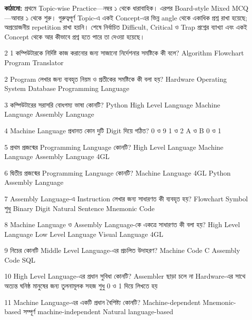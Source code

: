 \begin{infobox}
\textbf{কাঠামো:} প্রথমে Topic-wise Practice—নম্বর ১ থেকে ধারাবাহিক। এরপর Board-style Mixed MCQ—আবার ১ থেকে শুরু। গুরুত্বপূর্ণ Topic-এ একই Concept-এর ভিন্ন angle থেকে একাধিক প্রশ্ন রাখা হয়েছে; অপ্রয়োজনীয় repetition রাখা হয়নি। শেষে নির্বাচিত Difficult, Critical ও Trap প্রশ্নের ব্যাখ্যা এবং একই Concept থেকে আর কীভাবে প্রশ্ন হতে পারে তা দেওয়া হয়েছে।
\end{infobox}

\begin{multicols}{2}
\setlength{\columnsep}{4mm}
\raggedcolumns
{}
\mcq
{1}
{কম্পিউটারকে নির্দিষ্ট কাজ করানোর জন্য সাজানো নির্দেশনার সমষ্টিকে কী বলে?}
{Algorithm}
{Flowchart}
{Program}
{Translator}

\mcq
{2}
{Program লেখার জন্য ব্যবহৃত নিয়ম ও প্রতীকের সমষ্টিকে কী বলা হয়?}
{Hardware}
{Operating System}
{Database}
{Programming Language}

\mcq
{3}
{কম্পিউটারের সরাসরি বোধগম্য ভাষা কোনটি?}
{Python}
{High Level Language}
{Machine Language}
{Assembly Language}

\mcq
{4}
{Machine Language প্রধানত কোন দুটি Digit দিয়ে গঠিত?}
{0 ও 9}
{1 ও 2}
{A ও B}
{0 ও 1}

\mcq
{5}
{প্রথম প্রজন্মের Programming Language কোনটি?}
{High Level Language}
{Machine Language}
{Assembly Language}
{4GL}

\mcq
{6}
{দ্বিতীয় প্রজন্মের Programming Language কোনটি?}
{Machine Language}
{4GL}
{Python}
{Assembly Language}

\mcq
{7}
{Assembly Language-এ Instruction লেখার জন্য সাধারণত কী ব্যবহৃত হয়?}
{Flowchart Symbol}
{শুধু Binary Digit}
{Natural Sentence}
{Mnemonic Code}

\mcq
{8}
{Machine Language ও Assembly Language-কে একত্রে সাধারণত কী বলা হয়?}
{High Level Language}
{Low Level Language}
{Visual Language}
{4GL}

\mcq
{9}
{নিচের কোনটি Middle Level Language-এর প্রচলিত উদাহরণ?}
{Machine Code}
{C}
{Assembly Code}
{SQL}

\mcqwide
{10}
{High Level Language-এর প্রধান সুবিধা কোনটি?}
{Assembler ছাড়া চলে না}
{Hardware-এর সাথে অত্যন্ত ঘনিষ্ঠ}
{মানুষের জন্য তুলনামূলক সহজ}
{শুধু 0 ও 1 দিয়ে লিখতে হয়}

\mcqwide
{11}
{Machine Language-এর একটি প্রধান বৈশিষ্ট্য কোনটি?}
{Machine-dependent}
{Mnemonic-based}
{সম্পূর্ণ machine-independent}
{Natural language-based}


\end{multicols}
